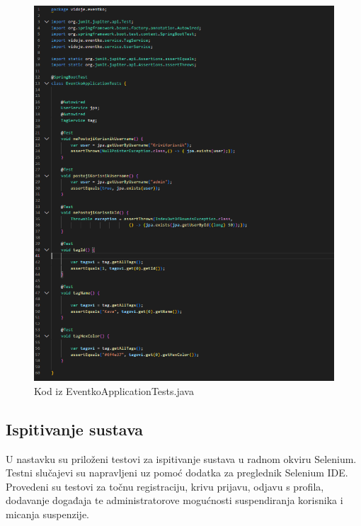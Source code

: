 			\begin{figure}[H]
				\includegraphics[width=\textwidth]{Slike/EventkoApplicationTests.png}
				\caption{Kod iz EventkoApplicationTests.java}
			\end{figure}
			
			\eject
			
			
			\subsection{Ispitivanje sustava}
			
			 
			 
		 	
		 	\indent U nastavku su priloženi testovi za ispitivanje sustava u radnom okviru Selenium. Testni slučajevi su napravljeni uz pomoć dodatka za preglednik Selenium IDE. Provedeni su testovi za točnu registraciju, krivu prijavu, odjavu s profila, dodavanje događaja te administratorove mogućnosti suspendiranja korisnika i micanja suspenzije.
		 	
